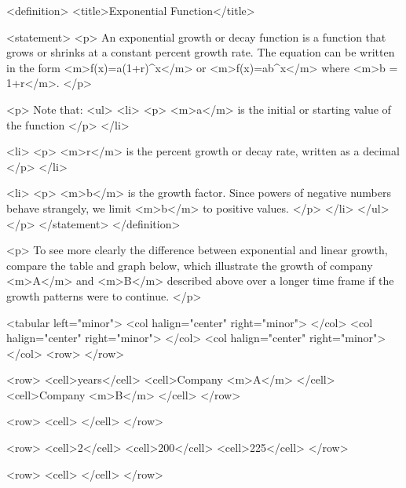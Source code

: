        <definition>
            <title>Exponential Function</title>

            <statement>
                <p>
                    An exponential growth or decay function is a function that grows or shrinks at a constant percent growth rate.
                    The equation can be written in the form <m>f(x)=a(1+r)^{x}</m> or <m>f(x)=ab^{x}</m> where <m>b = 1+r</m>.
                </p>

                <p>
                    Note that:
                    <ul>
                        <li>
                            <p>
                                <m>a</m> is the initial or starting value of the function
                            </p>
                        </li>

                        <li>
                            <p>
                                <m>r</m> is the percent growth or decay rate, written as a decimal
                            </p>
                        </li>

                        <li>
                            <p>
                                <m>b</m> is the growth factor. Since powers of negative numbers behave strangely, we limit <m>b</m> to positive values.
                            </p>
                        </li>
                    </ul>
                </p>
            </statement>
        </definition>

        <p>
            To see more clearly the difference between exponential and linear growth, compare the table and graph below, which illustrate the growth of company <m>A</m> and <m>B</m> described above over a longer time frame if the growth patterns were to continue.
        </p>

        <tabular left="minor">
            <col halign="center" right="minor"> </col> <col halign="center" right="minor"> </col> <col halign="center" right="minor"> </col>
            <row>
            </row>

            <row>
                <cell>years</cell>
                <cell>Company <m>A</m> </cell>
                <cell>Company <m>B</m> </cell>
            </row>

            <row>
                <cell> </cell>
            </row>

            <row>
                <cell>2</cell>
                <cell>200</cell>
                <cell>225</cell>
            </row>

            <row>
                <cell> </cell>
            </row>

